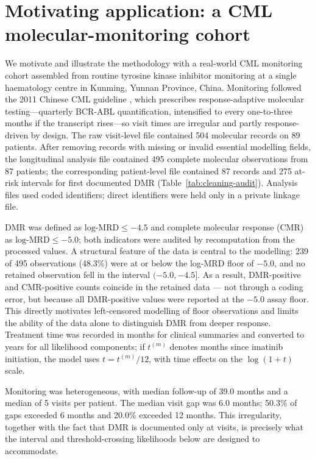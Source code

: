 \documentclass[11pt]{article}
\begin{document}
\section{Motivating application: a CML molecular-monitoring cohort}
\label{sec:motivating}

We motivate and illustrate the methodology with a real-world CML monitoring
cohort assembled from routine tyrosine kinase inhibitor monitoring at a single
haematology centre in Kunming, Yunnan Province, China. Monitoring followed the
2011 Chinese CML guideline \cite{CSH2011CMLGuideline}, which prescribes
response-adaptive molecular testing---quarterly BCR-ABL quantification,
intensified to every one-to-three months if the transcript rises---so visit
times are irregular and partly response-driven by design. The raw visit-level
file contained 504 molecular records on 89 patients. After removing records with missing or invalid
essential modelling fields, the longitudinal analysis file contained 495
complete molecular observations from 87 patients; the corresponding
patient-level file contained 87 records and 275 at-risk intervals for
first documented DMR (Table~\ref{tab:cleaning-audit}). Analysis files used coded
identifiers; direct identifiers were held only in a private linkage file.



DMR was defined as $\text{log-MRD}\le-4.5$ and complete molecular response
(CMR) as $\text{log-MRD}\le-5.0$; both indicators were audited by
recomputation from the processed values. A structural feature of the data
is central to the modelling: 239 of 495 observations (48.3\%) were at or
below the log-MRD floor of $-5.0$, and no retained observation fell in the
interval $(-5.0,-4.5]$. As a result, DMR-positive and CMR-positive counts
coincide in the retained data --- not through a coding error, but because
all DMR-positive values were reported at the $-5.0$ assay floor. This
directly motivates left-censored modelling of floor observations and
limits the ability of the data alone to distinguish DMR from deeper
response. Treatment time was recorded in months for clinical summaries and
converted to years for all likelihood components; if $t^{(m)}$ denotes
months since imatinib initiation, the model uses $t=t^{(m)}/12$, with
time effects on the $\log(1+t)$ scale.

Monitoring was heterogeneous, with median follow-up of 39.0 months and a
median of 5 visits per patient. The median visit gap was 6.0 months;
50.3\% of gaps exceeded 6 months and 20.0\% exceeded 12 months. This
irregularity, together with the fact that DMR is documented only at
visits, is precisely what the interval and threshold-crossing likelihoods
below are designed to accommodate.
\end{document}
